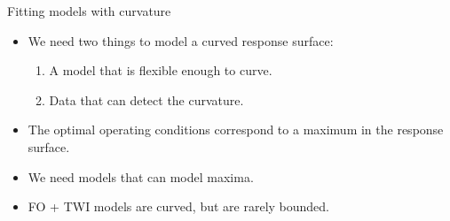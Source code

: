 \documentclass[10pt]{beamer}\usepackage[]{graphicx}\usepackage[]{color}
\begin{document}
\begin{frame}{Fitting models with curvature}

\begin{itemize}
  \item We need two things to model a curved response surface:
    \begin{enumerate}
      \item A model that is flexible enough to curve.
      \item Data that can detect the curvature.
    \end{enumerate}
  \item<2-> The optimal operating conditions correspond to a maximum in the response surface.
  \item<2-> We need models that can model maxima.
  \item<3-> FO + TWI models are curved, but are rarely bounded.
\end{itemize}


\end{frame}
\end{document}
